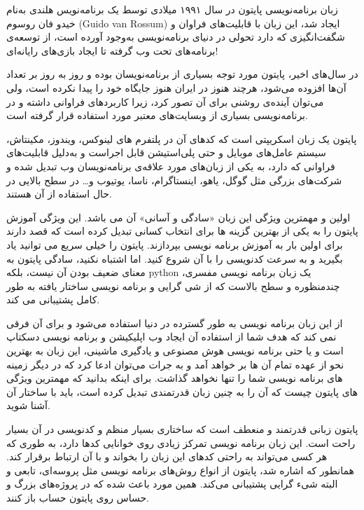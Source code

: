 
زبان برنامه‌نویسی پایتون در سال ۱۹۹۱ میلادی توسط یک برنامه‌نویس هلندی به‌نام خیدو فان روسوم (Guido van Rossum) ایجاد شد، این زبان با قابلیت‌های فراوان و شگفت‌انگیزی که دارد تحولی در دنیای برنامه‌نویسی به‌وجود آورده است، از توسعه‌ی برنامه‌های تحت وب گرفته تا ایجاد بازی‌های رایانه‌ای!

در سال‌های اخیر، پایتون مورد توجه بسیاری از برنامه‌نویسان بوده و روز به روز بر تعداد آن‌ها افزوده می‌شود، هرچند هنوز در ایران هنوز جایگاه خود را پیدا نکرده است، ولی می‌توان آینده‌‌‌ی روشنی برای آن تصور کرد، زیرا کاربردهای فراوانی داشته و در برنامه‌نویسی بسیاری از وبسایت‌های معتبر مورد استفاده قرار گرفته است.

پایتون یک زبان اسکریپتی است که کدهای آن در پلتفرم های لینوکس، ویندوز، مکینتاش، سیستم عامل‌های موبایل و حتی پلی‌استیشن قابل اجراست و به‌دلیل قابلیت‌های فراوانی که دارد، به یکی از زبان‌های مورد علاقه‌ی برنامه‌نویسان وب تبدیل شده و شرکت‌های بزرگی مثل گوگل، یاهو، اینستاگرام، ناسا، یوتیوب و… در سطح بالایی در حال استفاده از آن هستند.


اولین و مهمترین ویژگی این زبان «سادگی و آسانی» آن می باشد. این ویژگی آموزش پایتون را به یکی از بهترین گزینه ها برای انتخاب کسانی تبدیل کرده است که قصد دارند برای اولین بار به آموزش برنامه نویسی بپردازند. پایتون را خیلی سریع می توانید یاد بگیرید و به سرعت کدنویسی را با آن شروع کنید. اما اشتباه نکنید، سادگی پایتون به معنای ضعیف بودن آن نیست، بلکه python یک زبان برنامه نویسی مفسری، چندمنظوره و سطح بالاست که از شی گرایی و برنامه نویسی ساختار یافته به طور کامل پشتیبانی می کند.

از این زبان برنامه نویسی به طور گسترده در دنیا استفاده می‌شود و برای آن فرقی نمی کند که هدف شما از استفاده آن ایجاد وب اپلیکیشن و برنامه نویسی دسکتاپ است و یا حتی برنامه نویسی هوش مصنوعی و یادگیری ماشینی، این زبان به بهترین نحو از عهده تمام آن ها بر خواهد آمد و به ‌جرات می‌توان ادعا کرد که در دیگر زمینه های برنامه‌ نویسی شما را تنها نخواهد گذاشت. برای اینکه بدانید که مهمترین ویژگی های پایتون چیست که آن را به چنین زبان قدرتمندی تبدیل کرده است، باید با ساختار آن آشنا شوید.

پایتون زبانی قدرتمند و منعطف است که ساختاری بسیار منظم و کدنویسی در آن بسیار راحت است. این زبان برنامه نویسی تمرکز زیادی روی خوانایی کدها دارد، به طوری که هر کسی می‌تواند به راحتی کدهای این زبان را بخواند و با آن ارتباط برقرار کند. همانطور که اشاره شد، پایتون از انواع روش‌های برنامه نویسی مثل پروسه‌ای، تابعی و البته شیء گرایی پشتیبانی می‌کند. همین مورد باعث شده که در پروژه‌های بزرگ و حساس روی پایتون حساب باز کنند.

